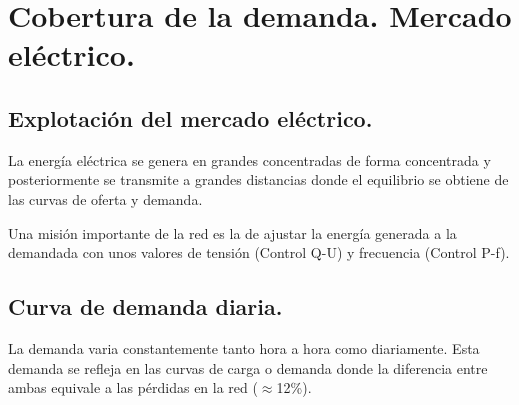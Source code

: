 \chapter{Cobertura de la demanda. Mercado eléctrico.}
\section{Explotación del mercado eléctrico.}
La energía eléctrica se genera en grandes concentradas de forma concentrada y posteriormente se transmite a grandes distancias donde el equilibrio se obtiene de las curvas de oferta y demanda.


Una misión importante de la red es la de ajustar la energía generada a la demandada con unos valores de tensión (Control Q-U) y frecuencia (Control P-f).
\section{Curva de demanda diaria.}
La demanda varia constantemente tanto hora a hora como diariamente. Esta demanda se refleja en las curvas de carga o demanda donde la diferencia entre ambas equivale a las pérdidas en la red ($\approx$12\%).

